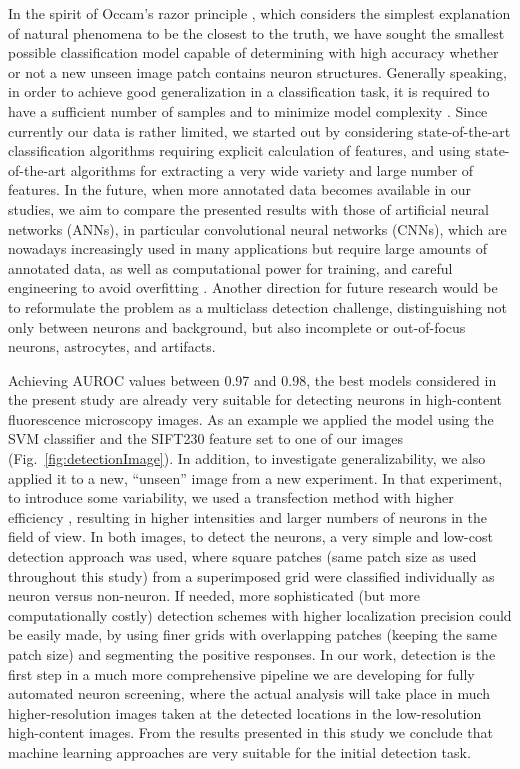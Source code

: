 In the spirit of Occam's razor principle \cite{Iacca201217, Hong2013210, Ebrahimpour2017214}, which considers the simplest explanation of natural phenomena to be the closest to the truth, we have sought the smallest possible classification model capable of determining with high accuracy whether or not a new unseen image patch contains neuron structures. Generally speaking, in order to achieve good generalization in a classification task, it is required to have a sufficient number of samples and to minimize model complexity \cite{Gupta20171}. Since currently our data is rather limited, we started out by considering state-of-the-art classification algorithms requiring explicit calculation of features, and using state-of-the-art algorithms for extracting a very wide variety and large number of features. In the future, when more annotated data becomes available in our studies, we aim to compare the presented results with those of artificial neural networks (ANNs), in particular convolutional neural networks (CNNs), which are nowadays increasingly used in many applications \cite{LeCun-2015} but require large amounts of annotated data, as well as computational power for training, and careful engineering to avoid overfitting \cite{6697897, Greenspan-2016, Tajbakhsh-2016, Shaikhina201751, Litjens-2017, Shen-2017}. Another direction for future research would be to reformulate the problem as a multiclass detection challenge, distinguishing not only between neurons and background, but also incomplete or out-of-focus neurons, astrocytes, and artifacts.

Achieving AUROC values between 0.97 and 0.98, the best models considered in the present study are already very suitable for detecting neurons in high-content fluorescence microscopy images. As an example we applied the model using the SVM classifier and the SIFT230 feature set to one of our images (Fig.~\ref{fig:detectionImage}). In addition, to investigate generalizability, we also applied it to a new, ``unseen'' image from a new experiment. In that experiment, to introduce some variability, we used a transfection method with higher efficiency \cite{Bredenbeek1993}, resulting in higher intensities and larger numbers of neurons in the field of view. In both images, to detect the neurons, a very simple and low-cost detection approach was used, where square patches (same patch size as used throughout this study) from a superimposed grid were classified individually as neuron versus non-neuron. If needed, more sophisticated (but more computationally costly) detection schemes with higher localization precision could be easily made, by using finer grids with overlapping patches (keeping the same patch size) and segmenting the positive responses. In our work, detection is the first step in a much more comprehensive pipeline we are developing for fully automated neuron screening, where the actual analysis will take place in much higher-resolution images taken at the detected locations in the low-resolution high-content images. From the results presented in this study we conclude that machine learning approaches are very suitable for the initial detection task.

